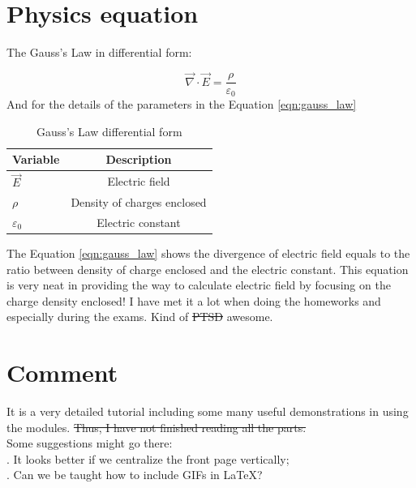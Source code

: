 \documentclass[14pt, letterpaper]{article}
\begin{document}
\newpage


\section{Physics equation}
The Gauss's Law in differential form:

\begin{equation}
	\label{eqn:gauss_law}
	\vec{\nabla} \cdot \vec{E}  =  \frac{\rho}{\varepsilon_0}
\end{equation}
And for the details of the parameters in the Equation \ref{eqn:gauss_law} \\
	
\begin{table}[!h]
	\begin{center}
	\begin{tabular}{|l|c|}
		\hline
		Variable & Description \\ 
		\hline
		$\vec{E}$ & Electric field \\ 
		\hline
		$\rho$ & Density of charges enclosed \\ 
		\hline
		$\varepsilon_0$ & Electric constant \\
		\hline
	\end{tabular}
	\caption{Gauss's Law differential form}
	\end{center}
\end{table}
The Equation \ref{eqn:gauss_law} shows the divergence of electric field equals to the ratio between density of 
charge enclosed and the electric constant. 
This equation is very neat in providing the way to calculate electric field by 
focusing on the charge density enclosed! I have met it a lot when doing the homeworks and especially during 
the exams. Kind of \sout{PTSD} awesome. 

\newpage


\section{Comment}
It is a very detailed tutorial including some many useful demonstrations in using the modules. \sout{Thus, I have
not finished reading all the parts.} \\
Some suggestions might go there: \\
. It looks better if we centralize the front page vertically; \\
. Can we be taught how to include GIFs in \LaTeX?
\end{document}
